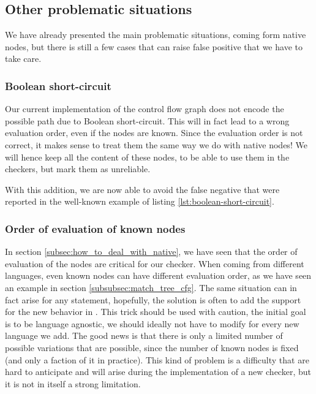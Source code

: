 \subsection{Other problematic situations}
\label{subsec:other_problematic_situation}
	
We have already presented the main problematic situations, coming form native nodes, but there is still a few cases that can raise false positive that we have to take care.

\subsubsection{Boolean short-circuit}
\label{subsubsec:boolean_short_circuit}

Our current implementation of the control flow graph does not encode the possible path due to Boolean short-circuit. 
This will in fact lead to a wrong evaluation order, even if the nodes are known. 
Since the evaluation order is not correct, it makes sense to treat them the same way we do with native nodes! 
We will hence keep all the content of these nodes, to be able to use them in the checkers, but mark them as unreliable. 



With this addition, we are now able to avoid the false negative that were reported in the well-known example of listing \ref{lst:boolean-short-circuit}.

\subsubsection{Order of evaluation of known nodes}
\label{subsubsec:evaluation_known_nodes}

In section \ref{subsec:how_to_deal_with_native}, we have seen that the order of evaluation of the nodes are critical for our checker.
When coming from different languages, even known nodes can have different evaluation order, as we have seen an example in section \ref{subsubsec:match_tree_cfg}. 
The same situation can in fact arise for any statement, hopefully, the solution is often to add the support for the new behavior in \slang{}.
This trick should be used with caution, the initial goal is to be language agnostic, we should ideally not have to modify \slang{} for every new language we add. The good news is that there is only a limited number of possible variations that are possible, since the number of known nodes is fixed (and only a faction of it in practice). 
This kind of problem is a difficulty that are hard to anticipate and will arise during the implementation of a new checker, but it is not in itself a strong limitation.

